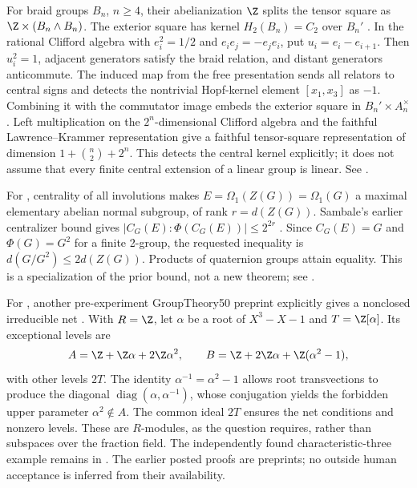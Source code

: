 For braid groups \(B_n\), \(n\ge4\), their abelianization
\(\Z\) splits the tensor square as
\(\Z\times(B_n\wedge B_n)\). The exterior square has
kernel \(H_2(B_n)=C_2\) over \(B_n'\)
\cite{bardakov-tensor,akita-braids}.
In the rational Clifford algebra with
\(e_i^2=1/2\) and \(e_ie_j=-e_je_i\), put \(u_i=e_i-e_{i+1}\).
Then \(u_i^2=1\), adjacent generators satisfy the braid
relation, and distant generators anticommute.
The induced map from the free presentation sends all
relators to central signs and detects the nontrivial
Hopf-kernel element \([x_1,x_3]\) as \(-1\).
Combining it with the commutator image embeds the exterior
square in \(B_n'\times A_n^\times\).
Left multiplication on the \(2^n\)-dimensional Clifford
algebra and the faithful Lawrence--Krammer representation
\cite{krammer} give a faithful tensor-square representation
of dimension \(1+\binom n2+2^n\).
This detects the central kernel explicitly; it does not
assume that every finite central extension of a linear
group is linear. See .

\label{prior:16.14}
For , centrality of all involutions makes
\(E=\Omega_1(Z(G))=\Omega_1(G)\) a maximal elementary
abelian normal subgroup, of rank \(r=d(Z(G))\).
Sambale's earlier centralizer bound gives
\(|C_G(E):\Phi(C_G(E))|\le2^{2r}\) \cite{sambale-rank}.
Since \(C_G(E)=G\) and \(\Phi(G)=G^2\) for a finite
2-group, the requested inequality is
\(d(G/G^2)\le2d(Z(G))\). Products of quaternion groups
attain equality. This is a specialization of the prior
bound, not a new theorem; see
.

\label{prior:19.48}
For , another pre-experiment GroupTheory50
preprint explicitly gives a nonclosed irreducible net
\cite{proofforum-net}. With \(R=\Z\), let \(\alpha\)
be a root of \(X^3-X-1\) and \(T=\Z[\alpha]\).
Its exceptional levels are
\[
 A=\Z+\Z\alpha+2\Z\alpha^2,\qquad
 B=\Z+2\Z\alpha+\Z(\alpha^2-1),
\]
with other levels \(2T\).
The identity \(\alpha^{-1}=\alpha^2-1\) allows root
transvections to produce the diagonal
\(\operatorname{diag}(\alpha,\alpha^{-1})\), whose
conjugation yields the forbidden upper parameter
\(\alpha^2\notin A\). The common ideal \(2T\) ensures
the net conditions and nonzero levels.
These are \(R\)-modules, as the question requires,
rather than subspaces over the fraction field.
The independently found characteristic-three example
remains in .
The earlier posted proofs are preprints; no outside
human acceptance is inferred from their availability.

